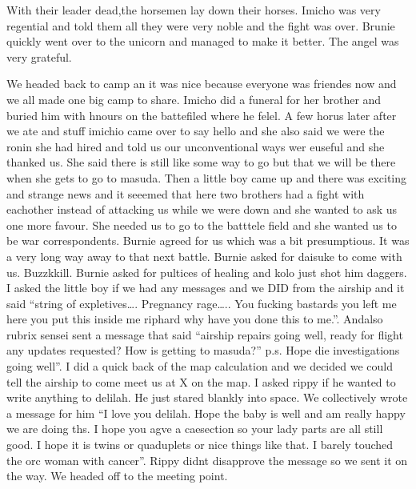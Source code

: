 With their leader dead,the horsemen lay down their horses. Imicho was very regential and told them all they were very noble and the fight was over. Brunie quickly went over to the unicorn and managed to make it better. The angel was very grateful.\medskip

We headed back to camp an it was nice because everyone was friendes now and we all made one big camp to share. Imicho did a funeral for her brother and buried him with hnours on the battefiled where he felel. A few horus later after we ate and stuff imichio came over to say hello and she also said we were the ronin she had hired and told us our unconventional ways wer euseful and she thanked us. She said there is still like some way to go but that we will be there when she gets to go to masuda. Then a little boy came up and there was exciting and strange news and it seeemed that here two brothers had a fight with eachother instead of attacking us while we were down and she wanted to ask us one more favour. She needed us to go to the batttele field and she wanted us to be war correspondents. Burnie agreed for us which was a bit presumptious. It was a very long way away to that next battle. Burnie asked for daisuke to come with us. Buzzkkill. Burnie asked for pultices of healing and kolo just shot him daggers. I asked the little boy if we had any messages and we DID from the airship and it said “string of expletives…. Pregnancy rage….. You fucking bastards you left me here you put this inside me riphard why have you done this to me.”. Andalso rubrix sensei sent a message that said “airship repairs going well, ready for flight any updates requested? How is getting to masuda?” p.s. Hope die investigations going well”. I did a quick back of the map calculation and we decided we could tell the airship to come meet us at X on the map. I asked rippy if he wanted to write anything to delilah. He just stared blankly into space. We collectively wrote a message for him “I love you delilah. Hope the baby is well and am really happy we are doing ths. I hope you agve a caesection so your lady parts are all still good. I hope it is twins or quaduplets or nice things like that. I barely touched the orc woman with cancer”. Rippy didnt disapprove the message so we sent it on the way. We headed off to the meeting point.\medskip

